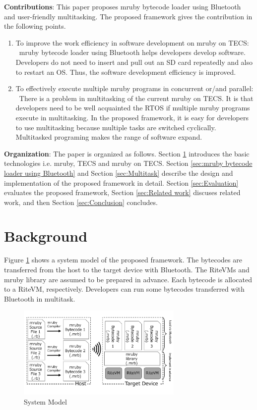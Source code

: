 \documentclass[conference,compsoc]{IEEEtran}
\begin{document}
{\bf Contributions}: This paper proposes mruby bytecode loader using Bluetooth and user-friendly multitasking.
The proposed framework gives the contribution in the following points.
\begin{enumerate}
\item To improve the  work efficiency in software development on mruby on TECS: \mbox{}\\
\ mruby bytecode loader using Bluetooth helps developers develop software.
Developers do not need to insert and pull out an SD card repeatedly and also to restart an OS.
Thus, the software development efficiency is improved.
\item To effectively execute multiple mruby programs in concurrent or/and parallel: \mbox{}\\
\ There is a problem in multitasking of the current mruby on TECS.
It is that developers need to be well acquainted the RTOS if multiple mruby programs execute in multitasking.
In the proposed framework, it is easy for developers to use multitasking because multiple tasks are switched cyclically.
Multitasked programing makes the range of software expand.
\end{enumerate}

{\bf Organization}: The paper is organized as follows.
Section \ref{sec:Background} introduces the basic technologies i.e. mruby, TECS and mruby on TECS.
Section \ref{sec:mruby bytecode loader using Bluetooth} and Section \ref{sec:Multitask} describe the design and implementation of the proposed framework in detail.
Section \ref{sec:Evaluation} evaluates the proposed framework, Section \ref{sec:Related work} discuses related work, and then Section \ref{sec:Conclusion} concludes.

\section{Background}
\label{sec:Background}
Figure \ref{fig:proposed} shows a system model of the proposed framework.
The bytecodes are transferred from the host to the target device with Bluetooth.
The RiteVMs and mruby library are assumed to be prepared in advance.
Each bytecode is allocated to a RiteVM, respectively.
Developers can run some bytecodes transferred with Bluetooth in multitask.

\begin{figure}[t]
    \centering
    \includegraphics[width=8cm,clip]{figure/proposed.pdf}
    \caption{System Model}
    \label{fig:proposed}
\end{figure}
\end{document}

